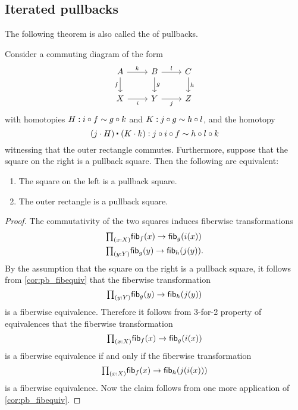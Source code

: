 \subsection{Iterated pullbacks}

The following theorem is also called the  of pullbacks.

\begin{prp}\label{thm:pb_pasting}
Consider a commuting diagram of the form
\begin{equation*}
\begin{tikzcd}
A \arrow[r,"k"] \arrow[d,swap,"f"] & B \arrow[r,"l"] \arrow[d,"g"] & C \arrow[d,"h"] \\
X \arrow[r,swap,"i"] & Y \arrow[r,swap,"j"] & Z
\end{tikzcd}
\end{equation*}
with homotopies $H:i\circ f\sim g\circ k$ and $K:j\circ g\sim h\circ l$, and the homotopy
\begin{equation*}
\ct{(j\cdot H)}{(K\cdot k)}:j\circ i\circ f\htpy h\circ l\circ k
\end{equation*}
witnessing that the outer rectangle commutes. Furthermore, suppose that the square on the right is a pullback square. Then the following are equivalent:
\begin{samepage}%
\begin{enumerate}
\item The square on the left is a pullback square.
\item The outer rectangle is a pullback square.
\end{enumerate}%
\end{samepage}%
\end{prp}

\begin{proof}
The commutativity of the two squares induces fiberwise transformations
\begin{align*}
& \prd{x:X}\fib{f}{x}\to \fib{g}{i(x)} \\
& \prd{y:Y}\fib{g}{y}\to \fib{h}{j(y)}.
\end{align*}
By the assumption that the square on the right is a pullback square, it follows from \cref{cor:pb_fibequiv} that the fiberwise transformation
\begin{equation*}
\prd{y:Y}\fib{g}{y}\to\fib{h}{j(y)}
\end{equation*}
is a fiberwise equivalence. Therefore it follows from 3-for-2 property of equivalences that the fiberwise transformation
\begin{equation*}
\prd{x:X}\fib{f}{x}\to\fib{g}{i(x)}
\end{equation*}
is a fiberwise equivalence if and only if the fiberwise transformation
\begin{equation*}
\prd{x:X}\fib{f}{x}\to\fib{h}{j(i(x))}
\end{equation*}
is a fiberwise equivalence. Now the claim follows from one more application of \cref{cor:pb_fibequiv}.
\end{proof}

